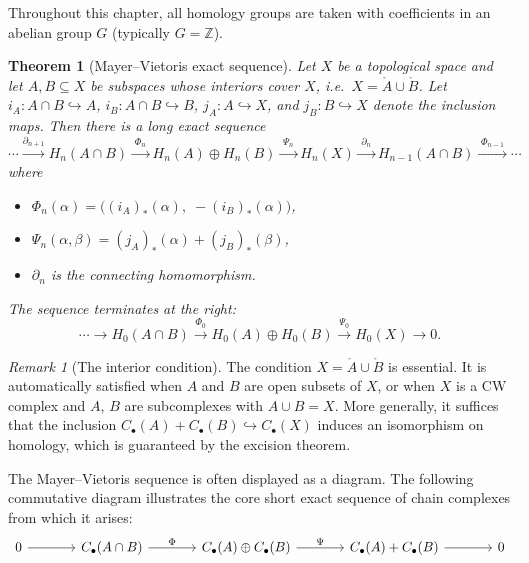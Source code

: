 \documentclass[12pt,a4paper,openany]{book}
\theoremstyle{definition}
\theoremstyle{plain}
\newtheorem{theorem}[definition]{Theorem}
\theoremstyle{remark}
\newtheorem{remark}[definition]{Remark}
\newcommand{\Z}{\mathbb{Z}}
\begin{document}
Throughout this chapter, all homology groups are taken with
coefficients in an abelian group $G$ (typically $G=\Z$).

\begin{theorem}[Mayer--Vietoris exact sequence]\label{thm:mv-exact}
Let $X$ be a topological space and let $A,B\subseteq X$ be subspaces
whose interiors cover $X$, i.e.\ $X=\mathring{A}\cup\mathring{B}$.
Let $i_A\colon A\cap B\hookrightarrow A$,
$i_B\colon A\cap B\hookrightarrow B$,
$j_A\colon A\hookrightarrow X$, and $j_B\colon B\hookrightarrow X$
denote the inclusion maps. Then there is a long exact sequence
\[
\cdots \xrightarrow{\partial_{n+1}}
H_n(A\cap B)
\xrightarrow{\;\Phi_n\;}
H_n(A)\oplus H_n(B)
\xrightarrow{\;\Psi_n\;}
H_n(X)
\xrightarrow{\;\partial_n\;}
H_{n-1}(A\cap B)
\xrightarrow{\;\Phi_{n-1}\;}
\cdots
\]
where
\begin{itemize}
  \item $\Phi_n(\alpha) = \bigl((i_A)_*(\alpha),\;-(i_B)_*(\alpha)\bigr)$,
  \item $\Psi_n(\alpha,\beta) = (j_A)_*(\alpha) + (j_B)_*(\beta)$,
  \item $\partial_n$ is the connecting homomorphism.
\end{itemize}
The sequence terminates at the right:
\[
\cdots \to H_0(A\cap B) \xrightarrow{\Phi_0}
H_0(A)\oplus H_0(B) \xrightarrow{\Psi_0} H_0(X) \to 0.
\]
\end{theorem}

\begin{remark}[The interior condition]
The condition $X = \mathring{A}\cup\mathring{B}$ is essential. It is
automatically satisfied when $A$ and $B$ are open subsets of $X$, or
when $X$ is a CW complex and $A$, $B$ are subcomplexes with $A\cup B=X$.
More generally, it suffices that the inclusion
$C_\bullet(A)+C_\bullet(B)\hookrightarrow C_\bullet(X)$ induces
an isomorphism on homology, which is guaranteed by the excision theorem.
\end{remark}

The Mayer--Vietoris sequence is often displayed as a diagram.
The following commutative diagram illustrates the core short exact
sequence of chain complexes from which it arises:
\[
\begin{tikzcd}[column sep=large]
0 \ar[r]
  & C_\bullet(A\cap B) \ar[r,"\Phi"]
  & C_\bullet(A)\oplus C_\bullet(B) \ar[r,"\Psi"]
  & C_\bullet(A)+C_\bullet(B) \ar[r]
  & 0
\end{tikzcd}
\]
\end{document}

